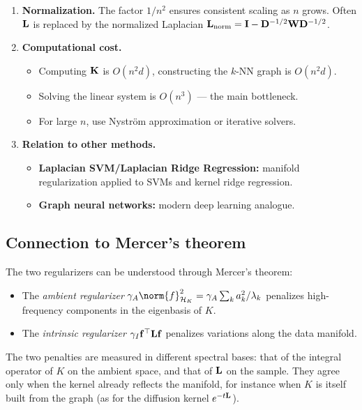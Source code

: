 \begin{notechapter}
\begin{enumerate}[label=\emph{\arabic*.}]
  \item \textbf{Normalization.} The factor $1/n^2$ ensures consistent
    scaling as $n$ grows. Often $\mathbf{L}$ is replaced by the normalized
    Laplacian $\mathbf{L}_{\text{norm}} = \mathbf{I} - \mathbf{D}^{-1/2}\mathbf{W}
    \mathbf{D}^{-1/2}$.

  \item \textbf{Computational cost.}
  \begin{itemize}
    \item Computing $\mathbf{K}$ is $O(n^2 d)$, constructing the $k$-NN graph
      is $O(n^2 d)$.
    \item Solving the linear system is $O(n^3)$ --- the main bottleneck.
    \item For large $n$, use Nystr\"om approximation or iterative solvers.
  \end{itemize}

  \item \textbf{Relation to other methods.}
  \begin{itemize}
    \item \textbf{Laplacian SVM/Laplacian Ridge Regression:} manifold
      regularization applied to SVMs and kernel ridge regression.
    \item \textbf{Graph neural networks:} modern deep learning analogue.
  \end{itemize}
\end{enumerate}

\subsection{Connection to Mercer's theorem}
\label{rkhs:subsec:manifold_mercer}

The two regularizers can be understood through Mercer's theorem:

\begin{itemize}
  \item The \emph{ambient regularizer} $\gamma_A \norm{f}_{\hk}^2
    = \gamma_A \sum_k a_k^2/\lambda_k$ penalizes high-frequency
    components in the eigenbasis of $K$.
  \item The \emph{intrinsic regularizer} $\gamma_I \mathbf{f}^\top
    \mathbf{L} \mathbf{f}$ penalizes variations along the data manifold.
\end{itemize}

The two penalties are measured in different spectral bases: that of the integral operator of $K$ on the ambient space, and that of $\mathbf{L}$ on the sample. They agree only when the kernel already reflects the manifold, for instance when $K$ is itself built from the graph (as for the diffusion kernel $e^{-t\mathbf{L}}$).


\end{notechapter}
